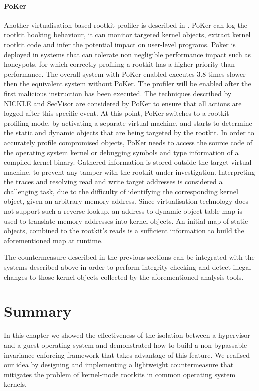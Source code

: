 \paragraph{PoKer}
Another virtualisation-based rootkit profiler is described in \cite{PoKer}. PoKer can log the rootkit hooking behaviour, it can monitor targeted kernel objects, extract kernel rootkit code and infer the potential impact on user-level programs. Poker is deployed in systems that can tolerate non negligible performance impact such as honeypots, for which correctly profiling a rootkit has a higher priority than performance. The overall system with PoKer enabled executes 3.8 times slower then the equivalent system without PoKer.
The profiler will be enabled after the first malicious instruction has been executed. The techniques described by NICKLE and SecVisor are considered by PoKer to ensure that all actions are logged after this specific event.
At this point, PoKer switches to a rootkit profiling mode, by activating a separate virtual machine, and starts to determine the static and dynamic objects that are being targeted by the rootkit. In order to accurately profile compromised objects, PoKer needs to access the source code of the operating system kernel or debugging symbols and type information of a compiled kernel binary. Gathered information is stored outside the target virtual machine, to prevent any tamper with the rootkit under investigation.
Interpreting the traces and resolving read and write target addresses is considered a challenging task, due to the difficulty of identifying the corresponding kernel object, given an arbitrary memory address.
Since virtualisation technology does not support such a reverse lookup, an address-to-dynamic object table map is used to translate memory addresses into kernel objects. An initial map of static objects, combined to the rootkit's reads is a sufficient information to build the aforementioned map at runtime.



The countermeasure described in the previous sections can be integrated with the systems described above in order to perform integrity checking and detect illegal changes to those kernel objects collected by the aforementioned analysis tools.


\section{Summary}\label{hr:conclusion}
In this chapter we showed the effectiveness of the isolation between a hypervisor and a guest operating system and demonstrated how to build a non-bypassable invariance-enforcing framework that takes advantage of this feature.
We realised our idea by designing and implementing a lightweight countermeasure that mitigates the problem of kernel-mode rootkits in common operating system kernels.

